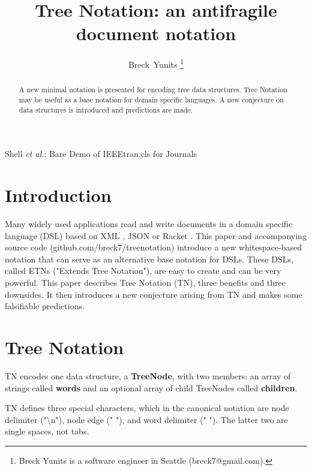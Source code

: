 \documentclass[journal]{IEEEtran}
\begin{document}
\title{Tree Notation: an antifragile document notation}

\author{Breck~Yunits%
\thanks{Breck Yunits is a software engineer in Seattle (breck7@gmail.com).}%
}

%
{Shell \MakeLowercase{\textit{et al.}}: Bare Demo of IEEEtran.cls for Journals}

\maketitle


\begin{abstract}
A new minimal notation is presented for encoding tree data structures. Tree Notation may be useful as a base notation for domain specific languages. A new conjecture on data structures is introduced and predictions are made.

\end{abstract}

\IEEEpeerreviewmaketitle

\section{Introduction}

Many widely used applications read and write documents in a domain specific language (DSL) based on XML \cite{Bray}, JSON \cite{Crockford} or Racket \cite{Racket}. This paper and accompanying source code (github.com/breck7/treenotation) introduce a new whitespace-based notation that can serve as an alternative base notation for DSLs. These DSLs, called ETNs ("Extends Tree Notation"), are easy to create and can be very powerful. This paper describes Tree Notation (TN), three benefits and three downsides. It then introduces a new conjecture arising from TN and makes some falsifiable predictions.

\section{Tree Notation}

TN encodes one data structure, a \textbf{TreeNode}, with two members: an array of strings called \textbf{words} and an optional array of child TreeNodes called \textbf{children}.

TN defines three special characters, which in the canonical notation are node delimiter ("\textbackslash n"), node edge (" "), and word delimiter (" "). The latter two are single spaces, not tabs.
\end{document}
